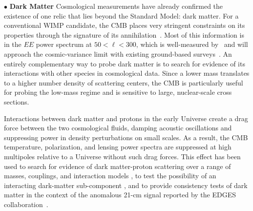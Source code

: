 \documentclass[PICOReport.tex]{subfiles}
\begin{document}

\noindent$\bullet$ {\bf Dark Matter} \hspace{0.1in} Cosmological measurements have already confirmed the existence of one relic that lies beyond the Standard Model: dark matter. For a conventional WIMP candidate, the CMB places very stringent constraints on its properties through the signature of its annihilation~\cite{Peebles:2000pn, Chen:2003gz, Padmanabhan:2005es}. Most of this information is in the $EE$ power spectrum at $50 < \ell < 300$, which is well-measured by \planck~and will approach the cosmic-variance limit with existing ground-based surveys~\cite{Madhavacheril:2013cna,Green:2018pmd}.  An entirely complementary way to probe dark matter is to search for evidence of its interactions with other species in cosmological data. Since a lower mass translates to a higher number density of scattering centers, the CMB is particularly useful for probing the low-mass regime and is sensitive to large, nuclear-scale cross sections. 
 
Interactions between dark matter and protons in the early Universe create a drag force between the two cosmological fluids, damping acoustic oscillations and suppressing power in density perturbations on small scales. As a result, the CMB temperature, polarization, and lensing power spectra are suppressed at high multipoles relative to a Universe without such drag forces.  This effect has been used to search for evidence of dark matter-proton scattering over a range of masses, couplings, and interaction models \citep{2002astro.ph..2496C,2004PhRvD..70h3501S,Dvorkin:2013cea,2018PhRvL.121h1301G,2018arXiv180108609B,2018PhRvD..97j3530X,2018arXiv180800001B, 2018PhRvD..98b3013S,2018arXiv180800001B,2018PhRvL.121h1301G,2018PhRvD..98h3510B}, to test the possibility of an interacting dark-matter sub-component \cite{2018arXiv180800001B}, and to provide consistency tests of dark matter in the context of the anomalous 21-cm signal reported by the EDGES collaboration~\citep{2018Natur.555...71B,2018Natur.555...67B,2018arXiv180800001B,2018arXiv180711482K}.

\end{document}
